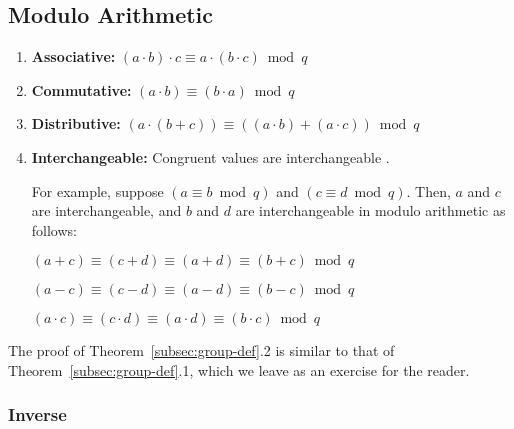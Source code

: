 \subsection{Modulo Arithmetic}
\label{subsec:modulo-arithmetic}


\begin{tcolorbox}[title={\textbf{\tboxtheorem{\ref*{subsec:group-def}.2} Properties of Modulo Arithmetic}}]

\begin{enumerate}
\item \textbf{Associative:} $(a \cdot b) \cdot c \equiv a \cdot (b \cdot c) \bmod q$

\item \textbf{Commutative:} $(a \cdot b) \equiv (b \cdot a) \bmod q$

\item \textbf{Distributive:} $(a \cdot (b + c)) \equiv ((a \cdot b) + (a \cdot c))  \bmod q$

\item \textbf{Interchangeable:} Congruent values are interchangeable . 

For example, suppose $(a \equiv b \bmod q)$ and $(c \equiv d \bmod q)$. Then, $a$ and $c$ are interchangeable, and $b$ and $d$ are interchangeable in modulo arithmetic as follows:

$(a + c) \equiv (c + d) \equiv (a + d) \equiv (b + c) \bmod q$

$(a - c) \equiv (c - d) \equiv (a - d) \equiv (b - c) \bmod q$

$(a \cdot c) \equiv (c \cdot d) \equiv (a \cdot d) \equiv (b \cdot c) \bmod q$

\end{enumerate}

\end{tcolorbox}

The proof of Theorem~\ref*{subsec:group-def}.2 is similar to that of Theorem~\ref*{subsec:group-def}.1, which we leave as an exercise for the reader. 


\subsubsection{Inverse}
\label{subsec:modulo-inverse}

